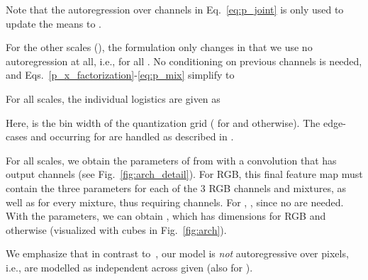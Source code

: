\documentclass[10pt,twocolumn,letterpaper]{article}
\begin{document}
{Note that the autoregression over channels in Eq.~\eqref{eq:p_joint} is only used to update the means  to .

For the other scales (), the formulation only changes in that we use no autoregression at all, i.e.,  for all . 
No conditioning on previous channels is needed, and Eqs.~\eqref{p_x_factorization}-\eqref{eq:p_mix} simplify to


For all scales, the individual logistics  are given as 

Here,  is the bin width of the quantization grid ( for  and  otherwise). The edge-cases  and  occurring for  are handled as described in \cite[Sec. 2.1]{Salimans2017pcnnpp}.

For all scales, we obtain the parameters of  from  with a  convolution that has  output channels (see Fig.~\ref{fig:arch_detail}).
For RGB, this final feature map must contain the three parameters  for each of the 3 RGB channels and  mixtures, as well as  for every mixture, thus requiring   channels. For , , since no  are needed.
With the parameters, we can obtain , which has dimensions  for RGB and  otherwise (visualized with cubes in Fig.~\ref{fig:arch}).


We emphasize that in contrast to~\cite{Salimans2017pcnnpp}, our model is \emph{not} autoregressive over pixels, i.e.,  are modelled as independent across  given  (also for ).




}
\end{document}
